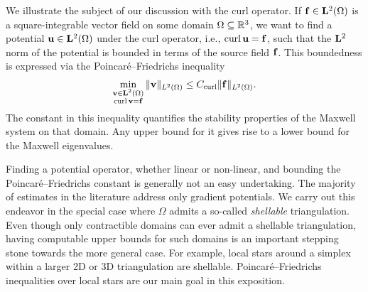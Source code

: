 \documentclass[10pt,letterpaper]{article}
\begin{document}

We illustrate the subject of our discussion with the curl operator. 
If ${\mathbf f} \in {\mathbf L}^{2}(\Omega)$ is a square-integrable vector field on some domain $\Omega \subseteq {\mathbb R}^3$, 
we want to find a potential ${\mathbf u} \in {\mathbf L}^2(\Omega)$ under the curl operator, i.e., $\operatorname{curl} {\mathbf u} = {\mathbf f}$, such that the ${\mathbf L}^2$ norm of the potential is bounded in terms of the source field ${\mathbf f}$. 
This boundedness is expressed via the Poincar\'e--Friedrichs inequality 
\begin{align*}
    \min\limits_{ \substack{ {\mathbf v} \in {\mathbf L}^{2}(\Omega) \\ \operatorname{curl} {\mathbf v} = {\mathbf f} } } \| {\mathbf v} \|_{L^{2}(\Omega)}
    \leq 
    C_{\operatorname{curl}}
    \| {\mathbf f} \|_{L^{2}(\Omega)}
    .
\end{align*}
The constant in this inequality quantifies the stability properties of the Maxwell system on that domain. Any upper bound for it gives rise to a lower bound for the Maxwell eigenvalues.

Finding a potential operator, whether linear or non-linear, and bounding the Poincar\'e--Friedrichs constant is generally not an easy undertaking. 
The majority of estimates in the literature address only gradient potentials. 
We carry out this endeavor in the special case where $\Omega$ admits a so-called \emph{shellable} triangulation. 
Even though only contractible domains can ever admit a shellable triangulation, 
having computable upper bounds for such domains is an important stepping stone towards the more general case. 
For example, local stars around a simplex within a larger 2D or 3D triangulation are shellable.
Poincar\'e--Friedrichs inequalities over local stars are our main goal in this exposition. 
\\
\end{document}
